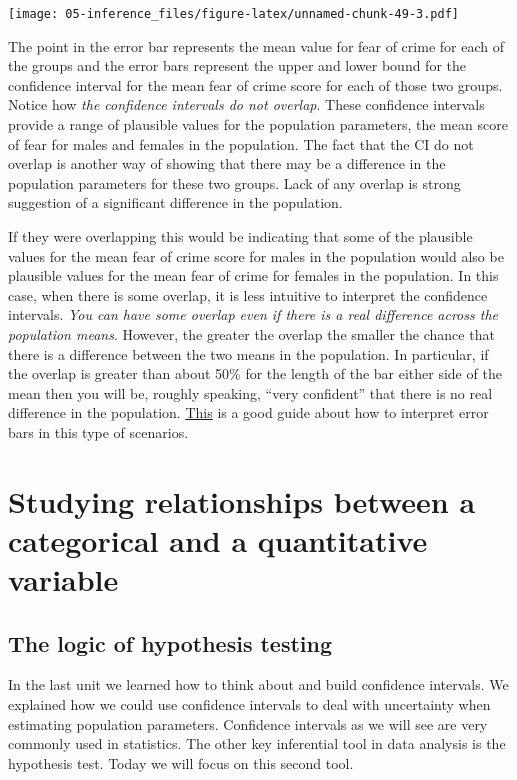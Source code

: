 \documentclass[
]{book}
\begin{document}
\texttt{[image: 05-inference\_files/figure-latex/unnamed-chunk-49-3.pdf]}

The point in the error bar represents the mean value for fear of crime for each of the groups and the error bars represent the upper and lower bound for the confidence interval for the mean fear of crime score for each of those two groups. Notice how \emph{the confidence intervals do not overlap}. These confidence intervals provide a range of plausible values for the population parameters, the mean score of fear for males and females in the population. The fact that the CI do not overlap is another way of showing that there may be a difference in the population parameters for these two groups. Lack of any overlap is strong suggestion of a significant difference in the population.

If they were overlapping this would be indicating that some of the plausible values for the mean fear of crime score for males in the population would also be plausible values for the mean fear of crime for females in the population. In this case, when there is some overlap, it is less intuitive to interpret the confidence intervals. \emph{You can have some overlap even if there is a real difference across the population means}. However, the greater the overlap the smaller the chance that there is a difference between the two means in the population. In particular, if the overlap is greater than about 50\% for the length of the bar either side of the mean then you will be, roughly speaking, ``very confident'' that there is no real difference in the population. \href{http://www.apastyle.org/manual/related/cumming-and-finch.pdf}{This} is a good guide about how to interpret error bars in this type of scenarios.

\hypertarget{studying-relationships-between-a-categorical-and-a-quantitative-variable}{%
\chapter{Studying relationships between a categorical and a quantitative variable}\label{studying-relationships-between-a-categorical-and-a-quantitative-variable}}

\hypertarget{the-logic-of-hypothesis-testing}{%
\section{The logic of hypothesis testing}\label{the-logic-of-hypothesis-testing}}

In the last unit we learned how to think about and build confidence intervals. We explained how we could use confidence intervals to deal with uncertainty when estimating population parameters. Confidence intervals as we will see are very commonly used in statistics. The other key inferential tool in data analysis is the hypothesis test. Today we will focus on this second tool.
\end{document}
